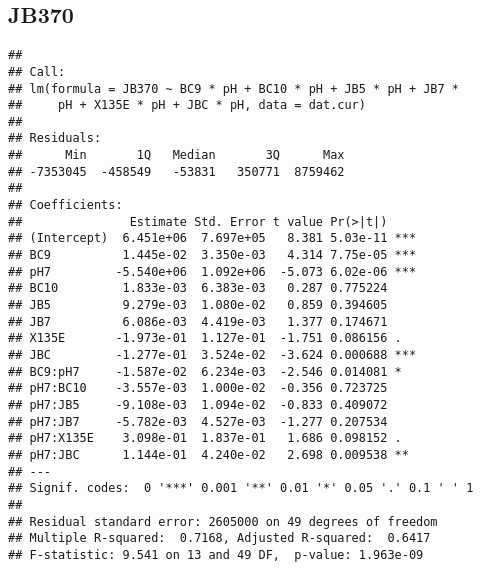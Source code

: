 \documentclass[
]{article}
\newenvironment{Shaded}{\begin{snugshade}}{\end{snugshade}}
\newcommand{\AttributeTok}[1]{\textcolor[rgb]{0.13,0.29,0.53}{#1}}
\newcommand{\DecValTok}[1]{\textcolor[rgb]{0.00,0.00,0.81}{#1}}
\newcommand{\FunctionTok}[1]{\textcolor[rgb]{0.13,0.29,0.53}{\textbf{#1}}}
\newcommand{\NormalTok}[1]{#1}
\newcommand{\OtherTok}[1]{\textcolor[rgb]{0.56,0.35,0.01}{#1}}
\newcommand{\SpecialCharTok}[1]{\textcolor[rgb]{0.81,0.36,0.00}{\textbf{#1}}}
\begin{document}
\hypertarget{jb370}{%
\subsection{JB370}\label{jb370}}

\begin{Shaded}
\end{Shaded}

\begin{verbatim}
## 
## Call:
## lm(formula = JB370 ~ BC9 * pH + BC10 * pH + JB5 * pH + JB7 * 
##     pH + X135E * pH + JBC * pH, data = dat.cur)
## 
## Residuals:
##      Min       1Q   Median       3Q      Max 
## -7353045  -458549   -53831   350771  8759462 
## 
## Coefficients:
##               Estimate Std. Error t value Pr(>|t|)    
## (Intercept)  6.451e+06  7.697e+05   8.381 5.03e-11 ***
## BC9          1.445e-02  3.350e-03   4.314 7.75e-05 ***
## pH7         -5.540e+06  1.092e+06  -5.073 6.02e-06 ***
## BC10         1.833e-03  6.383e-03   0.287 0.775224    
## JB5          9.279e-03  1.080e-02   0.859 0.394605    
## JB7          6.086e-03  4.419e-03   1.377 0.174671    
## X135E       -1.973e-01  1.127e-01  -1.751 0.086156 .  
## JBC         -1.277e-01  3.524e-02  -3.624 0.000688 ***
## BC9:pH7     -1.587e-02  6.234e-03  -2.546 0.014081 *  
## pH7:BC10    -3.557e-03  1.000e-02  -0.356 0.723725    
## pH7:JB5     -9.108e-03  1.094e-02  -0.833 0.409072    
## pH7:JB7     -5.782e-03  4.527e-03  -1.277 0.207534    
## pH7:X135E    3.098e-01  1.837e-01   1.686 0.098152 .  
## pH7:JBC      1.144e-01  4.240e-02   2.698 0.009538 ** 
## ---
## Signif. codes:  0 '***' 0.001 '**' 0.01 '*' 0.05 '.' 0.1 ' ' 1
## 
## Residual standard error: 2605000 on 49 degrees of freedom
## Multiple R-squared:  0.7168, Adjusted R-squared:  0.6417 
## F-statistic: 9.541 on 13 and 49 DF,  p-value: 1.963e-09
\end{verbatim}
\end{document}
